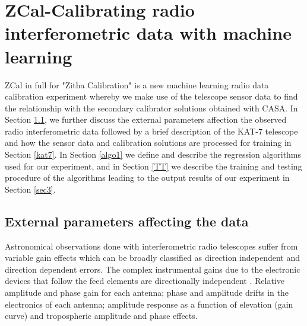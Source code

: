 \chapter{ZCal-Calibrating radio interferometric data with machine learning}
\label{c3}
ZCal in full for "Zitha Calibration" is a new machine learning radio data calibration experiment whereby we make use of the telescope sensor data to find the relationship with the secondary calibrator solutions obtained with CASA. In Section \ref{Exp}, we further discuss the external parameters affection the observed radio interferometric data followed by a brief description of the KAT-7 telescope and how the sensor data  and calibration solutions are processed for training in  Section \ref{kat7}. In Section \ref{algo1} we define and describe the regression algorithms used for our experiment, and in Section \ref{TT} we describe the training and testing procedure of the algorithms leading to the output results of our experiment in Section \ref{sec3}. 
\section{External parameters affecting the data}
\label{Exp}

Astronomical observations done with interferometric radio
telescopes suffer from variable gain effects which can be
broadly classified as direction independent and direction dependent errors. The complex instrumental gains due to the electronic devices that follow the feed elements are directionally independent \citep{bhatnagar2008correcting}. Relative amplitude and phase gain for each antenna; phase and amplitude drifts in the electronics of each antenna; amplitude response as a function of elevation (gain curve) and tropospheric amplitude and phase effects.

